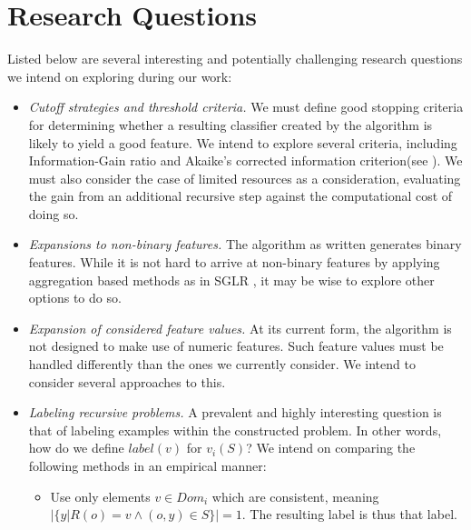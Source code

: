 \documentclass[12pt, a4paper]{article}
\theoremstyle{definition}
\begin{document}
\section{Research Questions}
Listed below are several interesting and potentially challenging research questions we intend on exploring during our work:
\begin{itemize}
    \item \emph{Cutoff strategies and threshold criteria.} We must define good stopping criteria for determining whether a resulting classifier created by the algorithm is likely to yield a good feature. We intend to explore several criteria, including Information-Gain ratio\citep{quinlan1986} and Akaike's corrected information criterion(see \citet{burnham2002model}). We must also consider the case of limited resources as a consideration, evaluating the gain from an additional recursive step against the computational cost of doing so. %
    \item \emph{Expansions to non-binary features.} The algorithm as written generates binary features. While it is not hard to arrive at non-binary features by applying aggregation based methods as in SGLR \citep{popescul200716}, it may be wise to explore other options to do so.
    \item \emph{Expansion of considered feature values.} At its current form, the algorithm is not designed to make use of numeric features. Such feature values must be handled differently than the ones we currently consider. We intend to consider several approaches to this.
    \item \emph{Labeling recursive problems.} A prevalent and highly interesting question is that of labeling examples within the constructed problem. In other words, how do we define $label(v)$ for $v_i(S)$? We intend on comparing the following methods in an empirical manner:
        \begin{itemize}
            \item Use only elements $v\in Dom_i$ which are consistent, meaning $|\{y|R(o)=v \wedge (o,y)\in S\}|=1$. The resulting label is thus that label.

\end{itemize}
\end{itemize}
\end{document}
